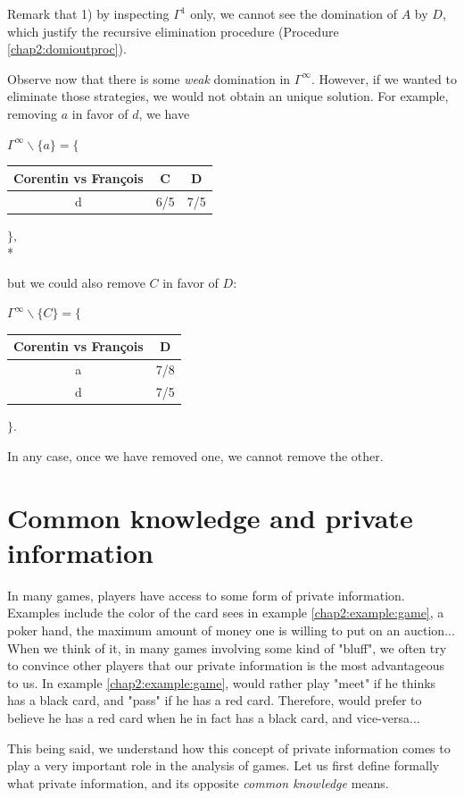 \begin{example}
Remark that 1) by inspecting $\Gamma^1$ only, we cannot see the domination of $A$ by $D$, which justify the recursive elimination procedure (Procedure \ref{chap2:domioutproc}).

Observe now that there is some \emph{weak} domination in $\Gamma^\infty$. However, if we wanted to eliminate those strategies, we would not obtain an unique solution.
For example, removing $a$ in favor of $d$, we have
\begin{center}
$\Gamma^{\infty}\backslash \{ a \}= \Bigg \{$
\begin{tabular}{c|cc}
  Corentin vs Fran\c{c}ois   & C & D\\ 
\hline d   & 6/5 & 7/5 \\
\end{tabular} 
$\Bigg \},$\\*
\end{center}
but we could also remove $C$ in favor of $D$:
\begin{center}
$\Gamma^{\infty}  \backslash \{C\} = \Bigg \{$
\begin{tabular}{c|c}
  Corentin vs Fran\c{c}ois   & D\\ 
\hline a   & 7/8 \\
 d   & 7/5 \\
\end{tabular} 
$\Bigg \}.$
\end{center}
In any case, once we have removed one, we cannot remove the other. 
\end{example}

\section{Common knowledge and private information}
 
 
In many games, players have access to some form of private information.
Examples include the color of the card \TAtwo{} sees in example \ref{chap2:example:game}, a poker hand, the maximum amount of money one is willing to put on an auction... When we think of it, in many games involving some kind of "bluff", we often try to convince other players that our private information is the most advantageous to us.
In example \ref{chap2:example:game}, \TAone{} would rather play "meet" if he thinks \TAtwo{} has a black card, and "pass" if he has a red card. Therefore, \TAtwo{} would prefer \TAone{} to believe he has a red card when he in fact has a black card, and vice-versa...

This being said, we understand how this concept of private information comes to play a very important role in the analysis of games. Let us first define formally 
what private information, and its opposite \emph{common knowledge} means.

